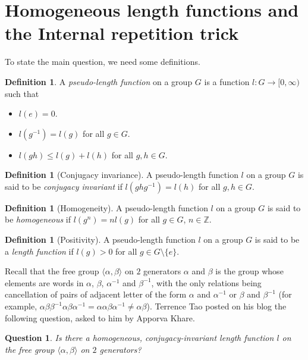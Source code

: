 \documentclass{amsart}
\theoremstyle{plain}
\newtheorem{question}[theorem]{Question}
\theoremstyle{definition}
\newtheorem{definition}[theorem]{Definition}
\theoremstyle{remark}
\newcommand{\Z}{\mathbb{Z}}
\newcommand{\F}{\langle \alpha, \beta \rangle}
\begin{document}
\section{Homogeneous length functions and the Internal repetition trick}\label{S:Homogeneous}

To state the main question, we need some definitions.
\begin{definition}
	A \emph{pseudo-length function} on a group $G$ is a function $l: G \to [0, \infty)$ such that
	\begin{itemize}
		\item $l(e) = 0$.
		\item $l(g^{-1}) = l(g)$ for all $g \in G$.
		\item $l(gh) \leq l(g) + l(h)$ for all $g,h\in G$.
	\end{itemize}
\end{definition}

\begin{definition}[Conjugacy invariance]
	A pseudo-length function $l$ on a group $G$ is said to be \emph{conjugacy invariant} if $l(ghg^{-1}) = l(h)$ for all $g, h\in G$.
\end{definition}

\begin{definition}[Homogeneity]
	A pseudo-length function $l$ on a group $G$ is said to be \emph{homogeneous} if $l(g^n) = nl(g)$ for all $g\in G$, $n \in\Z$.
\end{definition}

\begin{definition}[Positivity]
	A pseudo-length function $l$ on a group $G$ is said to be a \emph{length function} if $l(g) > 0$ for all $g\in G \setminus \{ e \}$.
\end{definition}

Recall that the free group $\F$ on $2$ generators $\alpha$ and $\beta$ is the group whose elements are words in $\alpha$, $\beta$, $\alpha^{-1}$ and $\beta^{-1}$, with the only relations being cancellation of pairs of adjacent letter of the form $\alpha$ and $\alpha^{-1}$ or $\beta$ and $\beta^{-1}$ (for example, $\alpha\beta\beta^{-1}\alpha\beta\alpha^{-1} = \alpha\alpha\beta\alpha^{-1}\neq\alpha\beta$).
Terrence Tao posted on his blog the following question, asked to him by Apporva Khare.

\begin{question}
	Is there a homogeneous, conjugacy-invariant length function $l$ on the free group $\F$ on $2$ generators?
\end{question}
\end{document}
